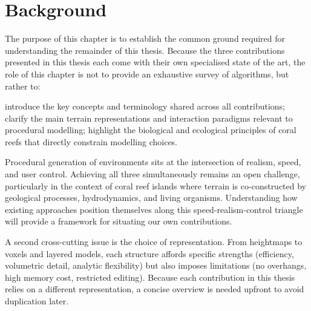 \resetgraphicspath
{}

\chapter{Background}
\label{chap:background}
\minitoc

The purpose of this chapter is to establish the common ground required for understanding the remainder of this thesis. Because the three contributions presented in this thesis each come with their own specialised state of the art, the role of this chapter is not to provide an exhaustive survey of algorithms, but rather to:
\begin{Itemize}
    \Item{} introduce the key concepts and terminology shared across all contributions;
    \Item{} clarify the main terrain representations and interaction paradigms relevant to procedural modelling;
    \Item{} highlight the biological and ecological principles of coral reefs that directly constrain modelling choices.
\end{Itemize}





Procedural generation of environments sits at the intersection of realism, speed, and user control. Achieving all three simultaneously remains an open challenge, particularly in the context of coral reef islands where terrain is co-constructed by geological processes, hydrodynamics, and living organisms. Understanding how existing approaches position themselves along this speed-realism-control triangle will provide a framework for situating our own contributions.

A second cross-cutting issue is the choice of representation. From heightmaps to voxels and layered models, each structure affords specific strengths (efficiency, volumetric detail, analytic flexibility) but also imposes limitations (no overhangs, high memory cost, restricted editing). Because each contribution in this thesis relies on a different representation, a concise overview is needed upfront to avoid duplication later.

